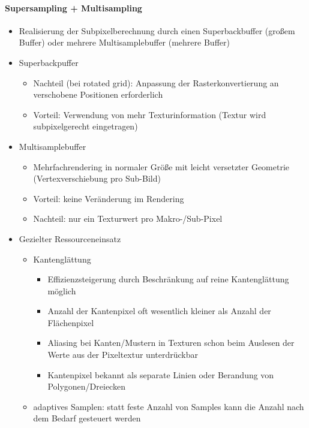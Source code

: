 \documentclass[10pt,landscape]{article}
\begin{document}
\begin{multicols}{3}
\paragraph{Supersampling + Multisampling}
\begin{itemize}
  \item Realisierung der Subpixelberechnung durch einen Superbackbuffer (großem Buffer) oder mehrere Multisamplebuffer (mehrere Buffer)
  \item Superbackpuffer
        \begin{itemize}
          \item Nachteil (bei rotated grid): Anpassung der Rasterkonvertierung an verschobene Positionen erforderlich
          \item Vorteil: Verwendung von mehr Texturinformation (Textur wird subpixelgerecht eingetragen)
        \end{itemize}
  \item Multisamplebuffer
        \begin{itemize}
          \item Mehrfachrendering in normaler Größe mit leicht versetzter Geometrie (Vertexverschiebung pro Sub-Bild)
          \item Vorteil: keine Veränderung im Rendering
          \item Nachteil: nur ein Texturwert pro Makro-/Sub-Pixel
        \end{itemize}
  \item Gezielter Ressourceneinsatz
        \begin{itemize} 
          \item Kantenglättung
                \begin{itemize} 
                  \item Effizienzsteigerung durch Beschränkung auf reine Kantenglättung möglich
                  \item Anzahl der Kantenpixel oft wesentlich kleiner als Anzahl der Flächenpixel
                  \item Aliasing bei Kanten/Mustern in Texturen schon beim Auslesen der Werte aus der Pixeltextur unterdrückbar
                  \item Kantenpixel bekannt als separate Linien oder Berandung von Polygonen/Dreiecken
                \end{itemize}
          \item adaptives Samplen: statt feste Anzahl von Samples kann die Anzahl nach dem Bedarf gesteuert werden
        \end{itemize}
\end{itemize}


\end{multicols}
\end{document}
